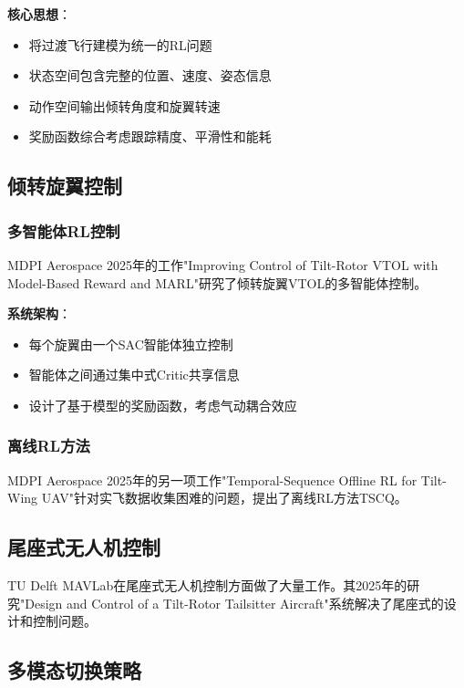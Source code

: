 \documentclass[12pt,a4paper]{ctexart}
\begin{document}
\textbf{核心思想}：
\begin{itemize}
    \item 将过渡飞行建模为统一的RL问题
    \item 状态空间包含完整的位置、速度、姿态信息
    \item 动作空间输出倾转角度和旋翼转速
    \item 奖励函数综合考虑跟踪精度、平滑性和能耗
\end{itemize}

\subsection{倾转旋翼控制}

\subsubsection{多智能体RL控制}

MDPI Aerospace 2025年的工作"Improving Control of Tilt-Rotor VTOL with Model-Based Reward and MARL"研究了倾转旋翼VTOL的多智能体控制。

\textbf{系统架构}：
\begin{itemize}
    \item 每个旋翼由一个SAC智能体独立控制
    \item 智能体之间通过集中式Critic共享信息
    \item 设计了基于模型的奖励函数，考虑气动耦合效应
\end{itemize}

\subsubsection{离线RL方法}

MDPI Aerospace 2025年的另一项工作"Temporal-Sequence Offline RL for Tilt-Wing UAV"针对实飞数据收集困难的问题，提出了离线RL方法TSCQ。

\subsection{尾座式无人机控制}

TU Delft MAVLab在尾座式无人机控制方面做了大量工作。其2025年的研究"Design and Control of a Tilt-Rotor Tailsitter Aircraft"系统解决了尾座式的设计和控制问题。

\subsection{多模态切换策略}
\end{document}
